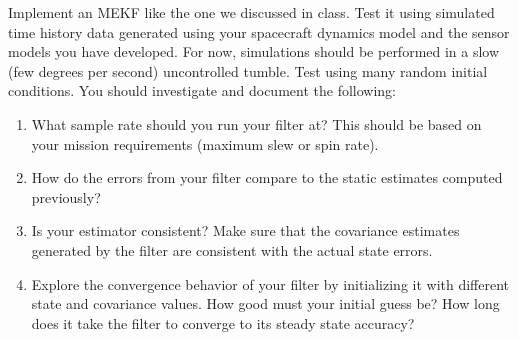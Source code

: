 \documentclass[11pt,letterpaper]{article}
\begin{document}
Implement an MEKF like the one we discussed in class. Test it using simulated time history data generated using your spacecraft dynamics model and the sensor models you have developed. For now, simulations should be performed in a slow (few degrees per second) uncontrolled tumble. Test using many random initial conditions. You should investigate and document the following:
\begin{enumerate}
	\item What sample rate should you run your filter at? This should be based on your mission requirements (maximum slew or spin rate).
	\item How do the errors from your filter compare to the static estimates computed previously?
	\item Is your estimator consistent? Make sure that the covariance estimates generated by the filter are consistent with the actual state errors.
	\item Explore the convergence behavior of your filter by initializing it with different state and covariance values. How good must your initial guess be? How long does it take the filter to converge to its steady state accuracy?
\end{enumerate}
\end{document}
